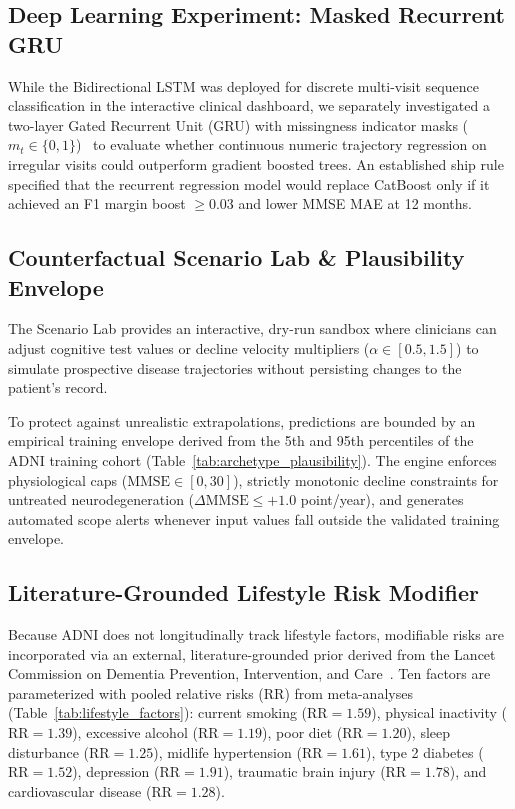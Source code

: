 \documentclass[11pt,a4paper]{article}
\begin{document}
\subsection{Deep Learning Experiment: Masked Recurrent GRU}
While the Bidirectional LSTM was deployed for discrete multi-visit sequence classification in the interactive clinical dashboard, we separately investigated a two-layer Gated Recurrent Unit (GRU) with missingness indicator masks ($m_t \in \{0, 1\}$)~\cite{che2018grud} to evaluate whether continuous numeric trajectory regression on irregular visits could outperform gradient boosted trees. An established ship rule specified that the recurrent regression model would replace CatBoost only if it achieved an F1 margin boost $\ge 0.03$ and lower MMSE MAE at 12 months.

\subsection{Counterfactual Scenario Lab & Plausibility Envelope}
The Scenario Lab provides an interactive, dry-run sandbox where clinicians can adjust cognitive test values or decline velocity multipliers ($\alpha \in [0.5, 1.5]$) to simulate prospective disease trajectories without persisting changes to the patient's record.

To protect against unrealistic extrapolations, predictions are bounded by an empirical training envelope derived from the 5th and 95th percentiles of the ADNI training cohort (Table~\ref{tab:archetype_plausibility}). The engine enforces physiological caps ($\text{MMSE} \in [0, 30]$), strictly monotonic decline constraints for untreated neurodegeneration ($\Delta \text{MMSE} \le +1.0$ point/year), and generates automated scope alerts whenever input values fall outside the validated training envelope.

\subsection{Literature-Grounded Lifestyle Risk Modifier}
Because ADNI does not longitudinally track lifestyle factors, modifiable risks are incorporated via an external, literature-grounded prior derived from the Lancet Commission on Dementia Prevention, Intervention, and Care~\cite{livingston2020lancet,livingston2024lancet}. Ten factors are parameterized with pooled relative risks (RR) from meta-analyses (Table~\ref{tab:lifestyle_factors}): current smoking ($\text{RR}=1.59$), physical inactivity ($\text{RR}=1.39$), excessive alcohol ($\text{RR}=1.19$), poor diet ($\text{RR}=1.20$), sleep disturbance ($\text{RR}=1.25$), midlife hypertension ($\text{RR}=1.61$), type 2 diabetes ($\text{RR}=1.52$), depression ($\text{RR}=1.91$), traumatic brain injury ($\text{RR}=1.78$), and cardiovascular disease ($\text{RR}=1.28$).
\end{document}
